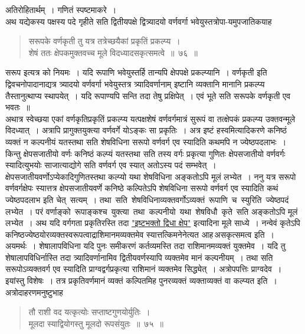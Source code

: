 \documentclass[11pt, openany]{book}
\begin{document}
 अतिरोहितार्थम्~। गणितं स्पष्टमाकरे~। \\

\vspace{-3mm}
 अथ यद्येकस्य पक्षस्य पदे गृहीते सति द्वितीयपक्षे द्वित्र्यादयो वर्णवर्गा 
भवेयुस्तत्रोपा-यमुपजातिकयाह\textendash
 \begin{quote}
     \bs
      सरूपके वर्णकृती तु यत्र तत्रेच्छयैकां प्रकृतिं प्रकल्प्य~। \\
 शेषं ततः क्षेपकमुक्तवच्च मूले विदध्यादसकृत्समत्वे~॥~७६~॥~
 \end{quote}
 
सरूप इत्यत्र को नियमः~। यदि रूपाणि भवेयुस्तर्हि तान्यपि क्षेपपक्षे 
प्रकल्प्यानि~। वर्णकृती इति द्विवचनोपादानाद्यत्र त्र्यादयो वर्णवर्गा भवेयुस्तत्र 
त्र्यादिवर्णानाम् इष्टानि व्यक्तानि मानानि प्रकल्प्य तैस्तानुत्थाप्य स्थापयेत्~। 
यदि रूपाण्यपि सन्ति तदा तेषु प्रक्षिपेत्~। एवं भूते सति सरूपके वर्णकृती
एव भवतः~॥ \\

\vspace{-3mm}
 अथात्र स्वेच्छया एकां वर्णकृतिप्रकृतिं प्रकल्प्य यत्पक्षशेषं वर्णवर्गमात्रं 
सुरूपं वा तत्क्षेपकं प्रकल्प्य उक्तवन्मूले विदध्यात्~। अत्रापि प्रागुक्तयुक्त्या 
वर्णवर्गे योऽङ्कः सा प्रकृतिः~। अत्र इष्टं हस्वमित्यादिकरणे कनिष्ठं व्यक्तं न
\newpage
\noindent कल्पनीयं यतस्तथा सति शेषविधिना सरूपो वर्णवर्ग एव स्यादिति कथमपि न ज्येष्ठपदलाभः~। किन्तु क्षेपसजातीयो वर्णः कनिष्ठं कल्प्यं यतस्तथा सति
तस्य वर्गः प्रकृत्या गुणितः क्षेपसजातीयो वर्णवर्गः स्यादित्युभयोः साजात्याद्योगे सति 
वर्णवर्ग एव स्यात् अतोऽस्य पदं सम्भवेत्~। क्षेपसजातीयवर्णोऽप्येकादिगुणितस्तथा कल्प्यो यथा शेषविधिना अङ्कतोऽपि मूलं लभ्येत~। ननु यत्र सरूपो वर्णवर्गक्षेपः स्यात्तत्र क्षेपसजातीयवर्णे कनिष्ठे कल्पितेऽपि शेषविधिना सरूपो वर्णवर्ग 
एव स्यादिति कथं ज्येष्ठपदलाभ इति चेत् \,सत्यम्~। तथा \,सति \,शेषविधिनाव्यक्तवर्गोऽव्यक्तं \,रूपाणि \,च \,स्युरिति \,ज्येष्ठपदं लभ्येत~। परं वर्णाङ्को \,रूपाङ्कश्च \,युक्त्या \,तथा \,कल्पनीयो \,यथा \,शेषविधौ \,कृते \,सति अङ्कतोऽपि मूलं लभ्येत~। अथ यदि वर्गगता प्रकृतिरस्ति तदा \hyperref[53]{"इष्टभक्तो द्विधा क्षेप"} इत्यादिना मूले साध्ये~। नन्वेवं कृतेऽपि कनिष्ठज्येष्ठयोरव्यक्तस्वरूपत्वाद्राशिमानमव्यक्तमेव स्यात्तत्किमनेनेत्यत आह\textendash \,असकृत्समत्व इति~। अयमर्थः~। 
शेषालापविधिना यदि पुनः समीकरणं कर्तव्यमस्ति तदा राशिमानमव्यक्तं 
युक्तमेव~। यदि तु शेषालापविधिर्नास्ति तदा त्र्यादिवर्णानामिव द्वितीयवर्णस्यापि 
व्यक्तमेव मानं कल्पनीयम्~। तथा सति सरूपोऽव्यक्तवर्ग एव स्यादिति 
प्राग्वद्वर्गप्रकृत्या राशिमानं व्यक्तमेव सिद्ध्येत्~। अत्रोपपत्तिः प्राग्वदेव~। 
इयांस्तु विशेषः~। तत्र प्रकृतिवर्णमानं व्यक्तं कल्पितमिह पुनरव्यक्तं व्यक्ताव्यक्तं 
वा कल्प्यत इति~। अत्रोदाहरणमनुष्टुभाह\textendash 
\begin{quote}
    \ex
     तौ राशी वद यत्कृत्योः सप्ताष्टगुणयोर्युतिः~। \\
 मूलदा स्याद्वियोगस्तु मूलदो रूपसंयुतः~॥~७५~॥~
\end{quote}
\end{document}
